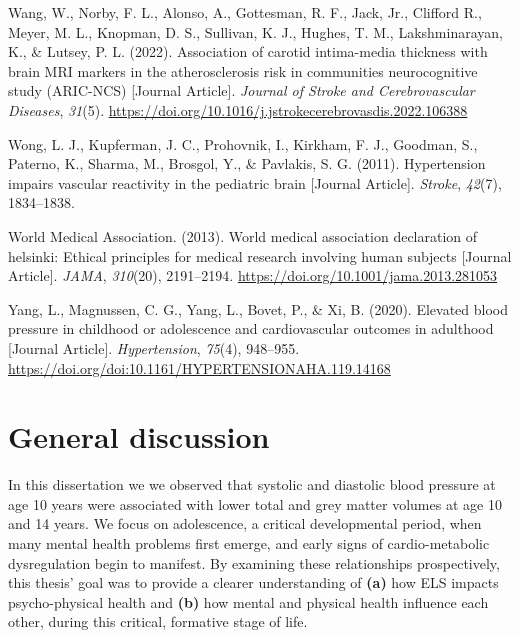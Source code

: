 \documentclass[
  letterpaper,
  DIV=11,
  numbers=noendperiod]{scrreport}
\newlength{\cslhangindent}
\newenvironment{CSLReferences}[2] %
 {\begin{list}{}{%
  \setlength{\itemindent}{0pt}
  \setlength{\leftmargin}{0pt}
  \setlength{\parsep}{0pt}
  \ifodd #1
   \setlength{\leftmargin}{\cslhangindent}
   \setlength{\itemindent}{-1\cslhangindent}
  \fi
  \setlength{\itemsep}{#2\baselineskip}}}
 {\end{list}}
\begin{document}
\begin{CSLReferences}{1}{0}
Wang, W., Norby, F. L., Alonso, A., Gottesman, R. F., Jack, Jr.,
Clifford R., Meyer, M. L., Knopman, D. S., Sullivan, K. J., Hughes, T.
M., Lakshminarayan, K., \& Lutsey, P. L. (2022). Association of carotid
intima-media thickness with brain MRI markers in the atherosclerosis
risk in communities neurocognitive study (ARIC-NCS) {[}Journal
Article{]}. \emph{Journal of Stroke and Cerebrovascular Diseases},
\emph{31}(5).
\url{https://doi.org/10.1016/j.jstrokecerebrovasdis.2022.106388}

Wong, L. J., Kupferman, J. C., Prohovnik, I., Kirkham, F. J., Goodman,
S., Paterno, K., Sharma, M., Brosgol, Y., \& Pavlakis, S. G. (2011).
Hypertension impairs vascular reactivity in the pediatric brain
{[}Journal Article{]}. \emph{Stroke}, \emph{42}(7), 1834--1838.

World Medical Association. (2013). World medical association declaration
of helsinki: Ethical principles for medical research involving human
subjects {[}Journal Article{]}. \emph{JAMA}, \emph{310}(20), 2191--2194.
\url{https://doi.org/10.1001/jama.2013.281053}

Yang, L., Magnussen, C. G., Yang, L., Bovet, P., \& Xi, B. (2020).
Elevated blood pressure in childhood or adolescence and cardiovascular
outcomes in adulthood {[}Journal Article{]}. \emph{Hypertension},
\emph{75}(4), 948--955.
\url{https://doi.org/doi:10.1161/HYPERTENSIONAHA.119.14168}

\end{CSLReferences}


\chapter{General discussion}\label{general-discussion}

In this dissertation we we observed that systolic and diastolic blood
pressure at age 10 years were associated with lower total and grey
matter volumes at age 10 and 14 years. We focus on adolescence, a
critical developmental period, when many mental health problems first
emerge, and early signs of cardio-metabolic dysregulation begin to
manifest. By examining these relationships prospectively, this thesis'
goal was to provide a clearer understanding of \textbf{(a)} how ELS
impacts psycho-physical health and \textbf{(b)} how mental and physical
health influence each other, during this critical, formative stage of
life.
\end{document}
